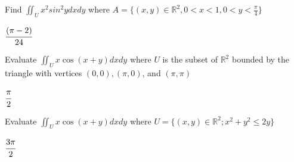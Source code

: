 \begin{defproblem}{1}
\begin{onlyproblem}
Find $\iint_U x^2sin^2y dxdy$ where $A=\{(x,y)\in\mathbb{R}^2, 0<x<1, 0<y<\frac{\pi}{4}\}$
\end{onlyproblem}
\begin{onlysolution}
 $\cfrac{(\pi-2)}{24}$
\end{onlysolution}
\end{defproblem}
\begin{defproblem}{2}
\begin{onlyproblem}
Evaluate $\iint_U x\cos (x+y)dxdy$ where $U$ is the subset of $\mathbb{R}^2$ bounded by the triangle with vertices $(0,0),(\pi,0)$, and $(\pi,\pi)$
\end{onlyproblem}
\begin{onlysolution}
 $\cfrac{\pi}{2}$
\end{onlysolution}
\end{defproblem}
\begin{defproblem}{3}
\begin{onlyproblem}
    Evaluate $\iint_U x\cos (x+y)dxdy$ where $U=\{(x,y)\in\mathbb{R}^2;x^2+y^2\leq 2y\}$
\end{onlyproblem}
\begin{onlysolution}
 $\cfrac{3\pi}{2}$
\end{onlysolution}
\end{defproblem}

